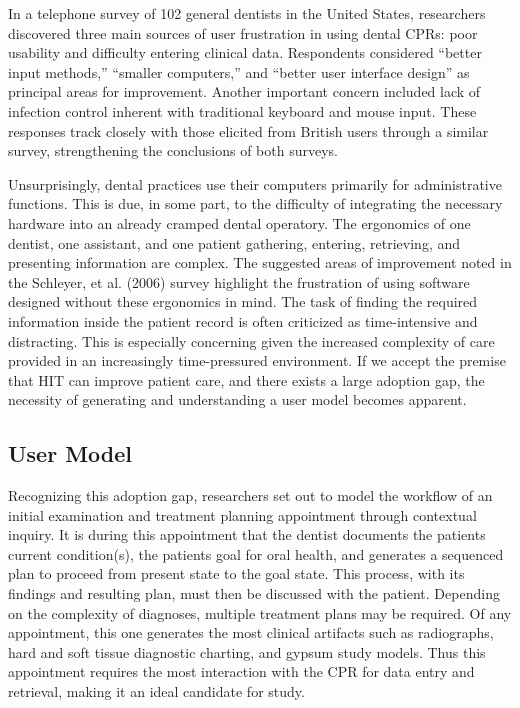 \documentclass[11pt]{article}
\begin{document}
In a telephone survey of 102 general dentists in the United States, researchers discovered three main sources of user frustration in using dental CPRs: poor usability and difficulty entering clinical data.\cite{Schleyer2006Clinical-Comput} Respondents considered ``better input methods,'' ``smaller computers,'' and ``better user interface design'' as principal areas for improvement. Another important concern included lack of infection control inherent with traditional keyboard and mouse input. These responses track closely with those elicited from British users through a similar survey, strengthening the conclusions of both surveys.\cite{John2003Questionnaire-s}

Unsurprisingly, dental practices use their computers primarily for administrative functions. This is due, in some part, to the difficulty of integrating the necessary hardware into an already cramped dental operatory.\cite{Schleyer2004Why-integration,Unthank2004Designing-your-} The ergonomics of one dentist, one assistant, and one patient gathering, entering, retrieving, and presenting information are complex. The suggested areas of improvement noted in the Schleyer, et al. (2006) survey highlight the frustration of using software designed without these ergonomics in mind. The task of finding the required information inside the patient record is often criticized as time-intensive and distracting.\cite{Nygren1998Helping-clinici} This is especially concerning given the increased complexity of care provided in an increasingly time-pressured environment. If we accept the premise that HIT can improve patient care, and there exists a large adoption gap, the necessity of generating and understanding a user model becomes apparent.

\subsection{User Model}
Recognizing this adoption gap, researchers set out to model the workflow of an initial examination and treatment planning appointment through contextual inquiry.\cite{Irwin2009A-preliminary-m} It is during this appointment that the dentist documents the patients current condition(s), the patients goal for oral health, and generates a sequenced plan to proceed from present state to the goal state. This process, with its findings and resulting plan, must then be discussed with the patient. Depending on the complexity of diagnoses, multiple treatment plans may be required. Of any appointment, this one generates the most clinical artifacts such as radiographs, hard and soft tissue diagnostic charting,  and gypsum study models. Thus this appointment requires the most interaction with the CPR for data entry and retrieval, making it an ideal candidate for study. 
\end{document}
